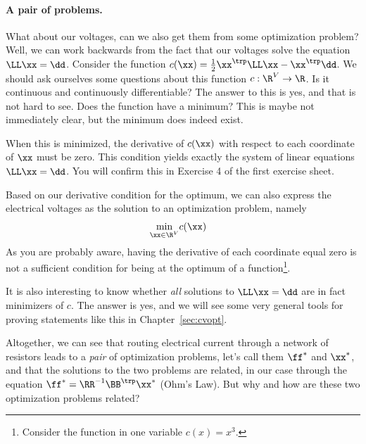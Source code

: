 \paragraph{A pair of problems.}
What about our voltages, can we also get them from some optimization
problem?
%
Well, we can work backwards from the fact that our voltages solve the
equation $\LL \xx = \dd$.
%
Consider the function $c(\xx) = \frac{1}{2} \xx^{\trp} \LL \xx -
\xx^{\trp}\dd$.
We should ask ourselves some questions about this function $c : \R^V
\to \R$. Is it continuous and continuously differentiable? The answer to this is
yes, and that is not hard to see.
Does the function have a minimum?
This is maybe not immediately clear, but the minimum does indeed exist.

When this is minimized, the derivative of $c(\xx)$ with respect to each coordinate of $\xx$
must be zero. This condition yields exactly the system of linear
equations $\LL \xx = \dd$.
You will confirm this in Exercise 4 of the first exercise sheet.

Based on our derivative condition for the optimum, we can also express the electrical voltages as the solution to
an optimization problem, namely
\begin{align*}
\min_{\xx \in \R^V} & c(\xx)
\end{align*}
As you are probably aware, having the derivative of each coordinate equal zero is not a
sufficient condition for being at the optimum of a
function\footnote{Consider the function in one variable $c(x) =
  x^3$.}.

It is also interesting to know whether \emph{all} solutions to $\LL
\xx = \dd$ are in fact minimizers of $c$. The answer is
yes, and we will see some very general tools for proving statements like
this in Chapter~\ref{sec:cvopt}.

Altogether, we can see that routing electrical current through a
network of resistors leads to a \emph{pair} of optimization problems,
let's call them $\ff^*$ and $\xx^*$,
and that the solutions to the two problems are related, in our case
through the equation $\ff^* = \RR^{-1}\BB^{\trp} \xx^*$ (Ohm's Law).
But why and how are these two optimization problems related?

